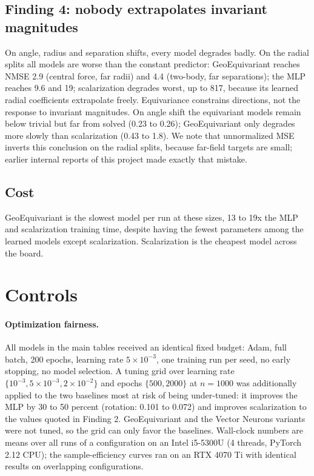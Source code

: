 \documentclass[11pt]{article}
\begin{document}
\subsection{Finding 4: nobody extrapolates invariant magnitudes}

On angle, radius and separation shifts, every model degrades badly. On the
radial splits all models are worse than the constant predictor:
GeoEquivariant reaches NMSE 2.9 (central force, far radii) and 4.4 (two-body,
far separations); the MLP reaches 9.6 and 19; scalarization degrades worst,
up to 817, because its learned radial coefficients extrapolate freely.
Equivariance constrains directions, not the response to invariant magnitudes.
On angle shift the equivariant models remain below trivial but far from
solved (0.23 to 0.26); GeoEquivariant only degrades more slowly than
scalarization (0.43 to 1.8). We note that unnormalized MSE inverts this
conclusion on the radial splits, because far-field targets are small; earlier
internal reports of this project made exactly that mistake.

\subsection{Cost}

GeoEquivariant is the slowest model per run at these sizes, 13 to 19x the MLP
and scalarization training time, despite having the fewest parameters among
the learned models except scalarization. Scalarization is the cheapest model
across the board.

\section{Controls}
\label{sec:controls}

\paragraph{Optimization fairness.} All models in the main tables received an
identical fixed budget: Adam, full batch, 200 epochs, learning rate
$5\times 10^{-3}$, one training run per seed, no early stopping, no model
selection. A tuning grid over learning rate
$\{10^{-3}, 5\times 10^{-3}, 2\times 10^{-2}\}$ and epochs $\{500, 2000\}$ at
$n{=}1000$ was additionally applied to the two baselines most at risk of
being under-tuned: it improves the MLP by 30 to 50 percent (rotation: 0.101
to 0.072) and improves scalarization to the values quoted in Finding 2.
GeoEquivariant and the Vector Neurons variants were not tuned, so the grid
can only favor the baselines. Wall-clock numbers are means over all runs of a
configuration on an Intel i5-5300U (4 threads, PyTorch 2.12 CPU); the
sample-efficiency curves ran on an RTX 4070 Ti with identical results on
overlapping configurations.
\end{document}
